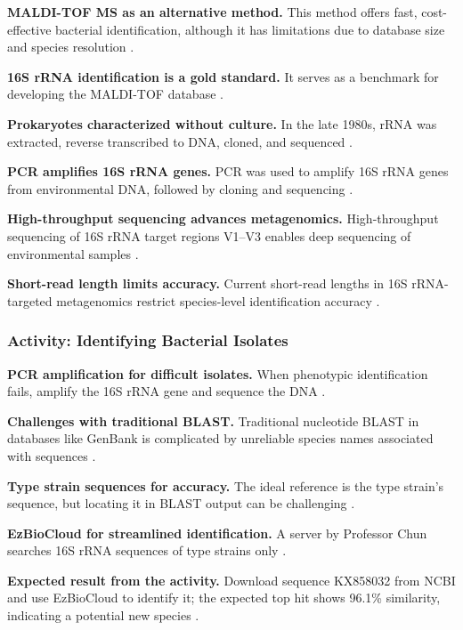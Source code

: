 \textbf{MALDI-TOF MS as an alternative method.} This method offers fast, cost-effective bacterial identification, although it has limitations due to database size and species resolution \cite*{L3-SeqBasedClass}.

\textbf{16S rRNA identification is a gold standard.} It serves as a benchmark for developing the MALDI-TOF database \cite*{L3-SeqBasedClass}.

\textbf{Prokaryotes characterized without culture.} In the late 1980s, rRNA was extracted, reverse transcribed to DNA, cloned, and sequenced \cite*{L3-SeqBasedClass}.

\textbf{PCR amplifies 16S rRNA genes.} PCR was used to amplify 16S rRNA genes from environmental DNA, followed by cloning and sequencing \cite*{L3-SeqBasedClass}.

\textbf{High-throughput sequencing advances metagenomics.} High-throughput sequencing of 16S rRNA target regions V1–V3 enables deep sequencing of environmental samples \cite*{L3-SeqBasedClass}.

\textbf{Short-read length limits accuracy.} Current short-read lengths in 16S rRNA-targeted metagenomics restrict species-level identification accuracy \cite*{L3-SeqBasedClass}.
\subsubsection{Activity: Identifying Bacterial Isolates}
\textbf{PCR amplification for difficult isolates.} When phenotypic identification fails, amplify the 16S rRNA gene and sequence the DNA \cite*{L3-SeqBasedClass}.

\textbf{Challenges with traditional BLAST.} Traditional nucleotide BLAST in databases like GenBank is complicated by unreliable species names associated with sequences \cite*{L3-SeqBasedClass}.

\textbf{Type strain sequences for accuracy.} The ideal reference is the type strain's sequence, but locating it in BLAST output can be challenging \cite*{L3-SeqBasedClass}.

\textbf{EzBioCloud for streamlined identification.} A server by Professor Chun searches 16S rRNA sequences of type strains only \cite*{L3-SeqBasedClass}.

\textbf{Expected result from the activity.} Download sequence KX858032 from NCBI and use EzBioCloud to identify it; the expected top hit shows 96.1\% similarity, indicating a potential new species \cite*{L3-SeqBasedClass}.
